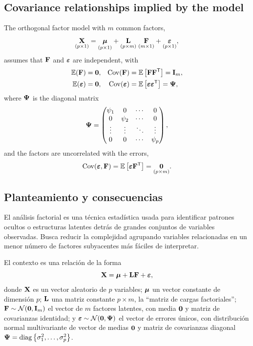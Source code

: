\subsection{Covariance relationships implied by the model}
\label{subsec:factor_covariance_structure}

The orthogonal factor model with $m$ common factors,
\begin{equation}
  \label{eq:factor_model_full}
  \underset{(p\times 1)}{\mathbf{X}}
  =\underset{(p\times 1)}{\boldsymbol{\mu}}
  +\underset{(p\times m)}{\mathbf{L}}\;\underset{(m\times 1)}{\mathbf{F}}
  +\underset{(p\times 1)}{\boldsymbol{\varepsilon}},
\end{equation}
assumes that $\mathbf{F}$ and $\boldsymbol{\varepsilon}$ are independent, with
\begin{align}
  \mathbb{E}(\mathbf{F})&=\mathbf{0}, &
  \operatorname{Cov}(\mathbf{F})&=\mathbb{E}\left[ \mathbf{F}\mathbf{F}^{\mathsf{T}} \right]=\mathbf{I}_m,
  \label{eq:factor_moments_F}\\
  \mathbb{E}(\boldsymbol{\varepsilon})&=\mathbf{0}, &
  \operatorname{Cov}(\boldsymbol{\varepsilon})&=\mathbb{E}\left[ \boldsymbol{\varepsilon}\boldsymbol{\varepsilon}^{\mathsf{T}} \right]=\boldsymbol{\Psi},
  \label{eq:factor_moments_eps}
\end{align}
where $\boldsymbol{\Psi}$ is the diagonal matrix
\begin{equation}
  \label{eq:psi_matrix}
  \boldsymbol{\Psi}=
  \begin{pmatrix}
    \psi_1 & 0 & \cdots & 0\\
    0 & \psi_2 & \cdots & 0\\
    \vdots & \vdots & \ddots & \vdots\\
    0 & 0 & \cdots & \psi_p
  \end{pmatrix},
\end{equation}
and the factors are uncorrelated with the errors,
\begin{equation}
  \label{eq:factor_moments_cross}
  \operatorname{Cov}(\boldsymbol{\varepsilon},\mathbf{F})=\mathbb{E}\left[ \boldsymbol{\varepsilon}\mathbf{F}^{\mathsf{T}} \right]
  =\underset{(p\times m)}{\mathbf{0}}.
\end{equation}

\subsection{Planteamiento y consecuencias}
\label{subsec:planteamiento_factorial}

El an\'alisis factorial es una t\'ecnica estad\'istica usada para identificar
patrones ocultos o estructuras latentes detr\'as de grandes conjuntos de
variables observadas. Busca reducir la complejidad agrupando variables
relacionadas en un menor n\'umero de factores subyacentes m\'as f\'aciles de
interpretar.

El contexto es una relaci\'on de la forma
\begin{equation}
  \label{eq:modelo_factorial_es}
  \mathbf{X}=\boldsymbol{\mu}+\mathbf{L}\mathbf{F}+\boldsymbol{\varepsilon},
\end{equation}
donde $\mathbf{X}$ es un vector aleatorio de $p$ variables; $\boldsymbol{\mu}$ un vector
constante de dimensi\'on $p$; $\mathbf{L}$ una matriz constante $p\times m$, la
``matriz de cargas factoriales''; $\mathbf{F}\sim\mathcal{N}(\mathbf{0},\mathbf{I}_m)$ el vector de
$m$ factores latentes, con media $\mathbf{0}$ y matriz de covarianzas identidad; y
$\boldsymbol{\varepsilon}\sim\mathcal{N}(\mathbf{0},\boldsymbol{\Psi})$ el vector de errores \'unicos, con
distribuci\'on normal multivariante de vector de medias $\mathbf{0}$ y matriz de
covarianzas diagonal $\boldsymbol{\Psi}=\operatorname{diag}\left\{ \sigma_1^2,\dots,\sigma_p^2 \right\}$.

